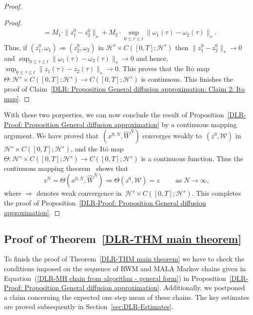 \begin{proof}
\begin{proof}
\begin{align*}
      & = M_1 \cdot \| z_1^0 - z_2^0 \|_s + M_2 \cdot \sup_{0 \leq \tau \leq t}  \| \omega_1(\tau) - \omega_2(\tau) \|_s.
    \end{align*}
    Thus, if $(z^0_1, \omega_1) \Longrightarrow (z^0_2, \omega_2)$ in $\mathcal{H}^s \times C([0,T]; \mathcal{H}^s)$ then $\| z_1^0 - z_2^0 \|_s \to 0$ and $\sup_{0 \leq \tau \leq t}  \| \omega_1(\tau) - \omega_2(\tau) \|_s \to 0$ and hence, $\sup_{0 \leq \tau \leq t} \| z_1(\tau) - z_2(\tau) \|_s \to 0$. This proves that the It\={o} map~$\Theta : \mathcal{H}^s \times C([0,T]; \mathcal{H}^s) \to  C([0,T]; \mathcal{H}^s)$ is continuous. This finishes the proof of Claim~\ref{DLR: Proposition General diffusion approximation: Claim 2: Ito map}.
     
  \end{proof}   
  
  With these two porperties, we can now conclude the result of Proposition~\ref{DLR-Proof: Proposition General diffusion approximation} by a continuous mapping argument. We have proved that~$(x^{0,N}, \widehat{W}^N)$ converges weakly to~$(z^0, \mathcal{W})$ in~$\mathcal{H}^s \times C([0,T];\mathcal{H}^s)$, and the It\={o} map~$\Theta : \mathcal{H}^s \times C([0,T]; \mathcal{H}^s) \to  C([0,T]; \mathcal{H}^s)$ is a continuous function. Thus the continuous mapping theorem~\autocite[Theorem 4.27]{Kallenberg2001} shows that
  \begin{equation*}
    z^N = \Theta (x^{0,N}, \widehat{W}^N) \Longrightarrow \Theta (z^0, \mathcal{W}) = z \qquad \text{  as } N \to \infty,
  \end{equation*}
  where $ \Longrightarrow$ denotes weak convergence in~$\mathcal{H}^s \times C([0,T]; \mathcal{H}^s)$. This completes the proof of Proposition~\ref{DLR-Proof: Proposition General diffusion approximation}.
  
   
\end{proof}


\subsection{Proof of Theorem~\ref{DLR-THM main theorem}}
\label{sec:sub:DLR-Proof}

To finish the proof of Theorem~\ref{DLR-THM main theorem} we have to check the conditions imposed on  the sequence of RWM and MALA Markov chains given in Equation~(\ref{DLR-MH chain from algorithm - general form}) in Proposition~\ref{DLR-Proof: Proposition General diffusion approximation}. Additionally, we postponed a claim concerning the expected one step mean of these chains. The key estimates are proved subsequently in Section~\ref{sec:DLR-Estimates}.

